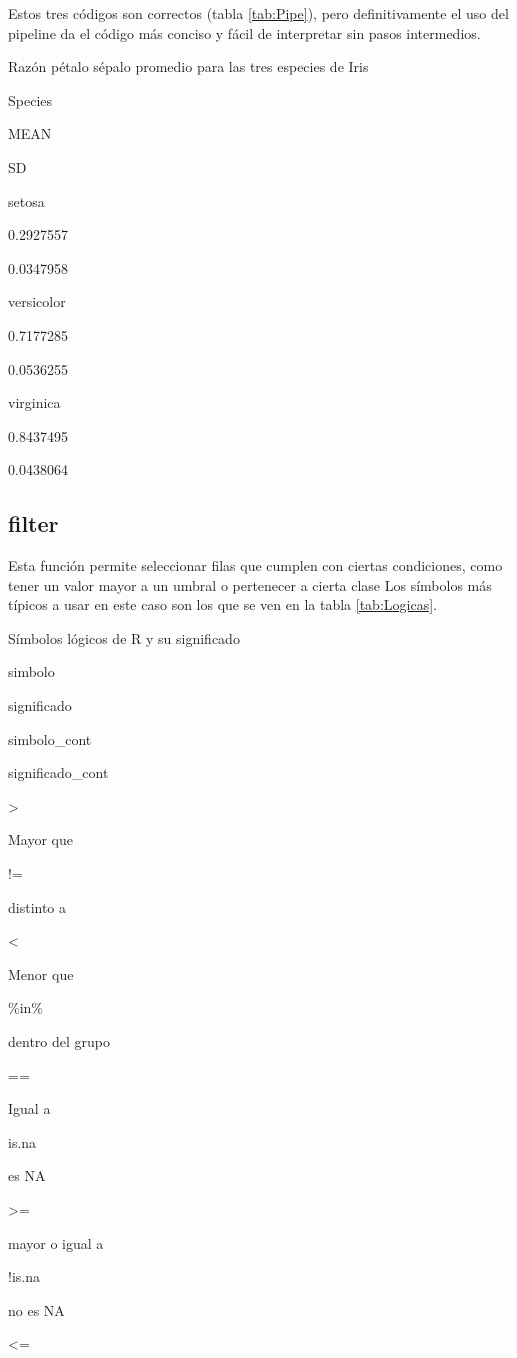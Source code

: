 \documentclass[]{book}
\begin{document}
Estos tres códigos son correctos (tabla \ref{tab:Pipe}), pero
definitivamente el uso del pipeline da el código más conciso y fácil de
interpretar sin pasos intermedios.

\label{tab:Pipe}Razón pétalo sépalo promedio para las tres especies de Iris

Species

MEAN

SD

setosa

0.2927557

0.0347958

versicolor

0.7177285

0.0536255

virginica

0.8437495

0.0438064

\hypertarget{filter}{%
\subsection{filter}\label{filter}}

Esta función permite seleccionar filas que cumplen con ciertas
condiciones, como tener un valor mayor a un umbral o pertenecer a cierta
clase Los símbolos más típicos a usar en este caso son los que se ven en
la tabla \ref{tab:Logicas}.

\label{tab:Logicas}Símbolos lógicos de R y su significado

simbolo

significado

simbolo\_cont

significado\_cont

\textgreater{}

Mayor que

!=

distinto a

\textless{}

Menor que

\%in\%

dentro del grupo

==

Igual a

is.na

es NA

\textgreater{}=

mayor o igual a

!is.na

no es NA

\textless{}=
\end{document}
